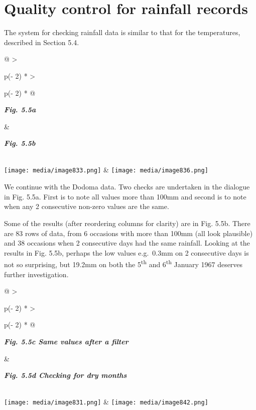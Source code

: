 \documentclass[
  letterpaper,
  DIV=11,
  numbers=noendperiod]{scrreprt}
\begin{document}
\section{Quality control for rainfall
records}\label{quality-control-for-rainfall-records}

The system for checking rainfall data is similar to that for the
temperatures, described in Section 5.4.

\begin{longtable}[]{@{}
  >{\raggedright\arraybackslash}p{(\columnwidth - 2\tabcolsep) * }
  >{\raggedright\arraybackslash}p{(\columnwidth - 2\tabcolsep) * }@{}}
\toprule\noalign{}
\begin{minipage}[b]{\linewidth}\raggedright
\textbf{\emph{Fig. 5.5a}}
\end{minipage} & \begin{minipage}[b]{\linewidth}\raggedright
\textbf{\emph{Fig. 5.5b}}
\end{minipage} \\
\midrule\noalign{}
\endhead
\bottomrule\noalign{}
\endlastfoot
\texttt{[image: media/image833.png]} &
\texttt{[image: media/image836.png]} \\
\end{longtable}

We continue with the Dodoma data. Two checks are undertaken in the
dialogue in Fig. 5.5a. First is to note all values more than 100mm and
second is to note when any 2 consecutive non-zero values are the same.

Some of the results (after reordering columns for clarity) are in Fig.
5.5b. There are 83 rows of data, from 6 occasions with more than 100mm
(all look plausible) and 38 occasions when 2 consecutive days had the
same rainfall. Looking at the results in Fig. 5.5b, perhaps the low
values e.g.~0.3mm on 2 consecutive days is not so surprising, but 19.2mm
on both the 5\textsuperscript{th} and 6\textsuperscript{th} January 1967
deserves further investigation.

\begin{longtable}[]{@{}
  >{\raggedright\arraybackslash}p{(\columnwidth - 2\tabcolsep) * }
  >{\raggedright\arraybackslash}p{(\columnwidth - 2\tabcolsep) * }@{}}
\toprule\noalign{}
\begin{minipage}[b]{\linewidth}\raggedright
\textbf{\emph{Fig. 5.5c Same values after a filter}}
\end{minipage} & \begin{minipage}[b]{\linewidth}\raggedright
\textbf{\emph{Fig. 5.5d Checking for dry months}}
\end{minipage} \\
\midrule\noalign{}
\endhead
\bottomrule\noalign{}
\endlastfoot
\texttt{[image: media/image831.png]} &
\texttt{[image: media/image842.png]} \\
\end{longtable}
\end{document}
